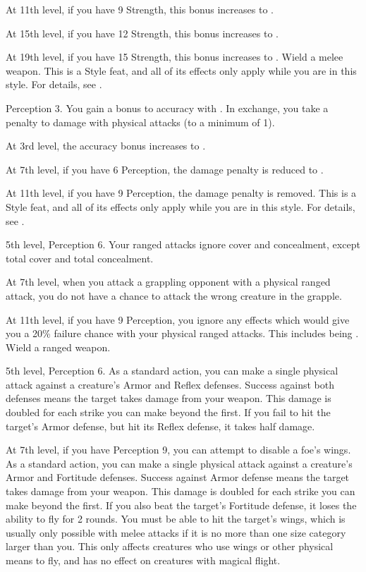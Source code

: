     At 11th level, if you have 9 Strength, this bonus increases to .

    At 15th level, if you have 12 Strength, this bonus increases to .

    At 19th level, if you have 15 Strength, this bonus increases to .
    \stylereq Wield a melee weapon.
     This is a Style feat, and all of its effects only apply while you are in this style.
    For details, see .

    \featpres Perception 3.
    \featben You gain a  bonus to accuracy with .
    In exchange, you take a  penalty to damage with physical attacks (to a minimum of 1).

    At 3rd level, the accuracy bonus increases to .

    At 7th level, if you have 6 Perception, the damage penalty is reduced to .

    At 11th level, if you have 9 Perception, the damage penalty is removed.
     This is a Style feat, and all of its effects only apply while you are in this style.
    For details, see .

    \featpres 5th level, Perception 6.
    \featben Your ranged attacks ignore cover and concealment, except total cover and total concealment.

    At 7th level, when you attack a grappling opponent with a physical ranged attack, you do not have a chance to attack the wrong creature in the grapple.

    At 11th level, if you have 9 Perception, you ignore any effects which would give you a 20\% failure chance with your physical ranged attacks.
    This includes being \impaired.
    \stylereq Wield a ranged weapon.

    \featpre 5th level, Perception 6.
    \featben As a standard action, you can make a single physical attack against a creature's Armor and Reflex defenses.
    Success against both defenses means the target takes damage from your weapon.
    This damage is doubled for each strike you can make beyond the first.
    If you fail to hit the target's Armor defense, but hit its Reflex defense, it takes half damage.

    At 7th level, if you have Perception 9, you can attempt to disable a foe's wings.
    As a standard action, you can make a single physical attack against a creature's Armor and Fortitude defenses.
    Success against Armor defense means the target takes damage from your weapon.
    This damage is doubled for each strike you can make beyond the first.
    If you also beat the target's Fortitude defense, it loses the ability to fly for 2 rounds.
    You must be able to hit the target's wings, which is usually only possible with melee attacks if it is no more than one size category larger than you.
    This only affects creatures who use wings or other physical means to fly, and has no effect on creatures with magical flight.

